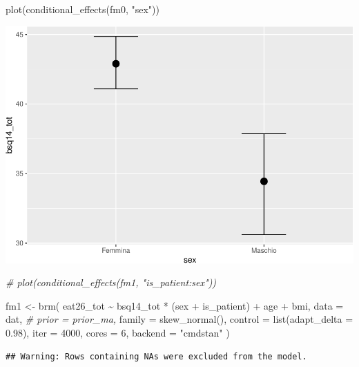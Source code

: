\documentclass[
]{article}
\newenvironment{Shaded}{\begin{snugshade}}{\end{snugshade}}
\newcommand{\AttributeTok}[1]{\textcolor[rgb]{0.77,0.63,0.00}{#1}}
\newcommand{\CommentTok}[1]{\textcolor[rgb]{0.56,0.35,0.01}{\textit{#1}}}
\newcommand{\DecValTok}[1]{\textcolor[rgb]{0.00,0.00,0.81}{#1}}
\newcommand{\FloatTok}[1]{\textcolor[rgb]{0.00,0.00,0.81}{#1}}
\newcommand{\FunctionTok}[1]{\textcolor[rgb]{0.00,0.00,0.00}{#1}}
\newcommand{\NormalTok}[1]{#1}
\newcommand{\OtherTok}[1]{\textcolor[rgb]{0.56,0.35,0.01}{#1}}
\newcommand{\SpecialCharTok}[1]{\textcolor[rgb]{0.00,0.00,0.00}{#1}}
\newcommand{\StringTok}[1]{\textcolor[rgb]{0.31,0.60,0.02}{#1}}
\begin{document}
\begin{Shaded}
\begin{Highlighting}[]
\FunctionTok{plot}\NormalTok{(}\FunctionTok{conditional\_effects}\NormalTok{(fm0, }\StringTok{"sex"}\NormalTok{))}
\end{Highlighting}
\end{Shaded}

\includegraphics{050_quest_groups_files/figure-latex/unnamed-chunk-2-14.pdf}

\begin{Shaded}
\begin{Highlighting}[]
\CommentTok{\# plot(conditional\_effects(fm1, "is\_patient:sex"))}

\NormalTok{fm1 }\OtherTok{\textless{}{-}} \FunctionTok{brm}\NormalTok{(}
\NormalTok{  eat26\_tot }\SpecialCharTok{\textasciitilde{}}\NormalTok{ bsq14\_tot }\SpecialCharTok{*}\NormalTok{ (sex }\SpecialCharTok{+}\NormalTok{ is\_patient) }\SpecialCharTok{+}\NormalTok{ age }\SpecialCharTok{+}\NormalTok{ bmi,}
  \AttributeTok{data =}\NormalTok{ dat, }
  \CommentTok{\# prior = prior\_ma,}
  \AttributeTok{family =} \FunctionTok{skew\_normal}\NormalTok{(),}
  \AttributeTok{control =} \FunctionTok{list}\NormalTok{(}\AttributeTok{adapt\_delta =} \FloatTok{0.98}\NormalTok{),}
  \AttributeTok{iter =} \DecValTok{4000}\NormalTok{,}
  \AttributeTok{cores =} \DecValTok{6}\NormalTok{,}
  \AttributeTok{backend =} \StringTok{"cmdstan"}
\NormalTok{)}
\end{Highlighting}
\end{Shaded}

\begin{verbatim}
## Warning: Rows containing NAs were excluded from the model.
\end{verbatim}
\end{document}
